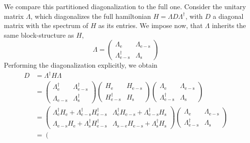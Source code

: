 \documentclass{article}
\begin{document}
We compare this partitioned diagonalization to the full one. Consider the unitary matrix $\Lambda$, which diagonalizes the full hamiltonian $H = \Lambda D\Lambda^\dagger$, with $D$ a diagonal matrix with the spectrum of $H$ as its entries. We impose now, that $\Lambda$ inherits the same block-structure as $H$,
\begin{equation}
	\Lambda = \begin{pmatrix}
		\Lambda_\mathrm{e} & \Lambda_\mathrm{e-s} \\
		\Lambda_\mathrm{e-s}^\dagger & \Lambda_\mathrm{s}
	\end{pmatrix}
\end{equation} 
Performing the diagonalization explicitly, we obtain
\begin{equation}
	\begin{split}
		D &= \Lambda^\dagger H\Lambda \\
		&= \begin{pmatrix}
			\Lambda_\mathrm{e}^\dagger & \Lambda_\mathrm{e-s}^\dagger \\
			\Lambda_\mathrm{e-s} & \Lambda_\mathrm{s}^\dagger
		\end{pmatrix} 
		\begin{pmatrix}
			H_\mathrm{e} & H_\mathrm{e-s} \\
			H_\mathrm{e-s}^\dagger & H_\mathrm{s}
		\end{pmatrix}
		\begin{pmatrix}
			\Lambda_\mathrm{e} & \Lambda_\mathrm{e-s} \\
			\Lambda_\mathrm{e-s}^\dagger & \Lambda_\mathrm{s}
		\end{pmatrix}\\
		&= \begin{pmatrix}
			\Lambda_\mathrm{e}^\dagger H_\mathrm{e} + \Lambda^\dagger_\mathrm{e-s}H_\mathrm{e-s}^\dagger & \Lambda_\mathrm{e}^\dagger H_\mathrm{e-s} + \Lambda^\dagger_\mathrm{e-s}H_\mathrm{s}\\
			\Lambda_\mathrm{e-s} H_\mathrm{e} + \Lambda^\dagger_\mathrm{s}H_\mathrm{e-s}^\dagger & \Lambda_\mathrm{s-e} H_\mathrm{e-s} + \Lambda^\dagger_\mathrm{s}H_\mathrm{s}
		\end{pmatrix}
		\begin{pmatrix}
			\Lambda_\mathrm{e} & \Lambda_\mathrm{e-s} \\
			\Lambda_\mathrm{e-s}^\dagger & \Lambda_\mathrm{s}
		\end{pmatrix}\\
		&= \left(\begin{array}{c|c}

\end{array}
\end{split}
\end{equation}
\end{document}
